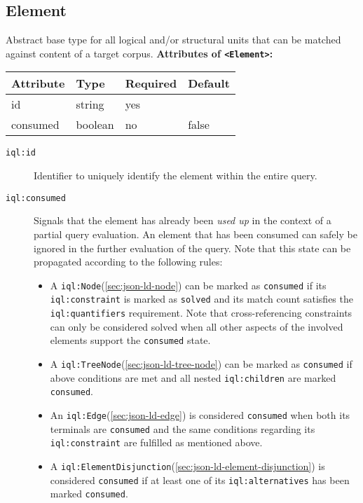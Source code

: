 \documentclass[11pt]{article}
\newcommand{\compresslist}{ %
	\setlength{\topsep}{0pt}
	\setlength{\itemsep}{1pt}
	\setlength{\parskip}{0pt}
	\setlength{\parsep}{0pt}
}
\newcommand{\iqlns}{iql:}
\newcommand{\iqlType}[1]{\texttt{\iqlns#1}}
\newcommand{\iqlBaseType}[1]{\texttt{\textless#1\textgreater}}
\newcommand{\desc}[1]{\noindent#1\newline\medskip}
\newenvironment{attributes}[1]{
\noindent\textbf{Attributes of #1:}\newline\medskip
\begin{tabular}{|p{0.28\textwidth}|p{0.16\textwidth}|p{0.17\textwidth}|p{0.15\textwidth}|}
	\hline
	\textbf{Attribute} & \textbf{Type} & \textbf{Required} & \textbf{Default} \\ 
	\hline
	\hline
}{
\end{tabular}
}
\newcommand{\attribute}[4]{
	#1 & #2 & #3 & #4 \\
	\hline
}
\begin{document}
\subsection{Element}
\label{sec:json-ld-element}
\desc{Abstract base type for all logical and/or structural units that can be matched against content of a target corpus.}
\begin{attributes}{\iqlBaseType{Element}}
	\attribute{id}{string}{yes}{}
	\attribute{consumed}{boolean}{no}{false}
\end{attributes}
\begin{description}
	\item[\iqlType{id}] Identifier to uniquely identify the element within the entire query.
	\item[\iqlType{consumed}] Signals that the element has already been \textit{used up} in the context of a partial query evaluation. An element that has been consumed can safely be ignored in the further evaluation of the query. Note that this state can be propagated according to the following rules:
	\begin{itemize}[leftmargin=*,topsep=0pt]\compresslist
		\item A \iqlType{Node}(\ref{sec:json-ld-node}) can be marked as \texttt{consumed} if its \iqlType{constraint} is marked as \texttt{solved} and its match count satisfies the \iqlType{quantifiers} requirement. Note that cross-referencing constraints can only be considered solved when all other aspects of the involved elements support the \texttt{consumed} state.
		\item A \iqlType{TreeNode}(\ref{sec:json-ld-tree-node}) can be marked as \texttt{consumed} if above conditions are met and all nested \iqlType{children} are marked \texttt{consumed}.
		\item An \iqlType{Edge}(\ref{sec:json-ld-edge}) is considered \texttt{consumed} when both its terminals are \texttt{consumed} and the same conditions regarding its \iqlType{constraint} are fulfilled as mentioned above.
		\item A \iqlType{ElementDisjunction}(\ref{sec:json-ld-element-disjunction}) is considered \texttt{consumed} if at least one of its \iqlType{alternatives} has been marked \texttt{consumed}.
	\end{itemize}
\end{description}
\end{document}
